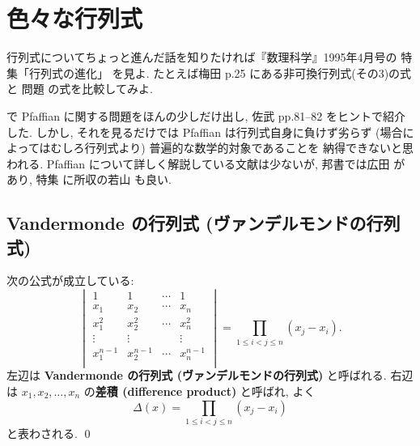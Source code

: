 \documentclass[12pt,twoside]{jarticle}
\begin{document}

\section{色々な行列式}
\label{sec:various-det}

行列式についてちょっと進んだ話を知りたければ『数理科学』1995年4月号の
特集「行列式の進化」 \cite{det-evo} を見よ.
たとえば梅田 \cite{Umeda} p.25 にある非可換行列式(その3)の式と
問題  の式を比較してみよ.

で Pfaffian に関する問題をほんの少しだけ出し, 
佐武 \cite{satake} pp.81--82 をヒントで紹介した.
しかし, それを見るだけでは Pfaffian は行列式自身に負けず劣らず 
(場合によってはむしろ行列式より) 普遍的な数学的対象であることを
納得できないと思われる.
Pfaffian について詳しく解説している文献は少ないが, 
邦書では広田 \cite{Hirota} があり, 
特集 \cite{det-evo} に所収の若山 \cite{Wakayama} も良い.


\subsection{Vandermonde の行列式 (ヴァンデルモンドの行列式)}

\begin{question}
  次の公式が成立している:
  \begin{equation*}
    \begin{vmatrix}
      1         & 1         & \cdots & 1 \\
      x_1       & x_2       & \cdots & x_n \\
      x_1^2     & x_2^2     & \cdots & x_n^2 \\
      \vdots    & \vdots    &        & \vdots \\
      x_1^{n-1} & x_2^{n-1} & \cdots & x_n^{n-1} \\
    \end{vmatrix}
    = 
    \prod_{1\le i<j\le n} (x_j - x_i).
  \end{equation*}
  左辺は {\bf Vandermonde の行列式 (ヴァンデルモンドの行列式)} と呼ばれる.
  右辺は $x_1,x_2,\ldots,x_n$ の{\bf 差積 (difference product)} と呼ばれ, よく
  \begin{equation*}
    \Delta(x) = \prod_{1\le i<j\le n} (x_j - x_i)
  \end{equation*}
  と表わされる. \qed
\end{question}
\end{document}
